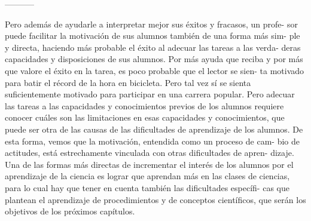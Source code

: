 -----------

Pero además de ayudarle a interpretar mejor sus éxitos y fracasos, un profe- sor puede facilitar la motivación de sus alumnos también de una forma más sim- ple y directa, haciendo más probable el éxito al adecuar las tareas a las verda- deras capacidades y disposiciones de sus alumnos. Por más ayuda que reciba y por más que valore el éxito en la tarea, es poco probable que el lector se sien- ta motivado para batir el récord de la hora en bicicleta. Pero tal vez sí se sienta suficientemente motivado para participar en una carrera popular. Pero adecuar las tareas a las capacidades y conocimientos previos de los alumnos requiere conocer cuáles son las limitaciones en esas capacidades y conocimientos, que puede ser otra de las causas de las dificultades de aprendizaje de los alumnos. De esta forma, vemos que la motivación, entendida como un proceso de cam- bio de actitudes, está estrechamente vinculada con otras dificultades de apren- dizaje. Una de las formas más directas de incrementar el interés de los alumnos por el aprendizaje de la ciencia es lograr que aprendan más en las clases de ciencias, para lo cual hay que tener en cuenta también las dificultades específi- cas que plantean el aprendizaje de procedimientos y de conceptos científicos, que serán los objetivos de los próximos capítulos.













